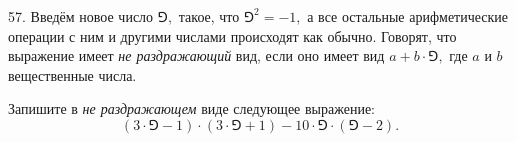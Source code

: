 57. Введём новое число $\Game,$ такое, что $\Game^2=-1,$ а все остальные арифметические операции с ним и другими числами происходят как обычно. Говорят, что выражение имеет {\it не раздражающий} вид, если оно имеет вид $a+b\cdot\Game,$ где $a$ и $b$ вещественные числа.

Запишите в {\it не раздражающем} виде следующее выражение:
$$(3\cdot\Game-1)\cdot(3\cdot\Game+1)-10\cdot\Game\cdot(\Game-2).$$
